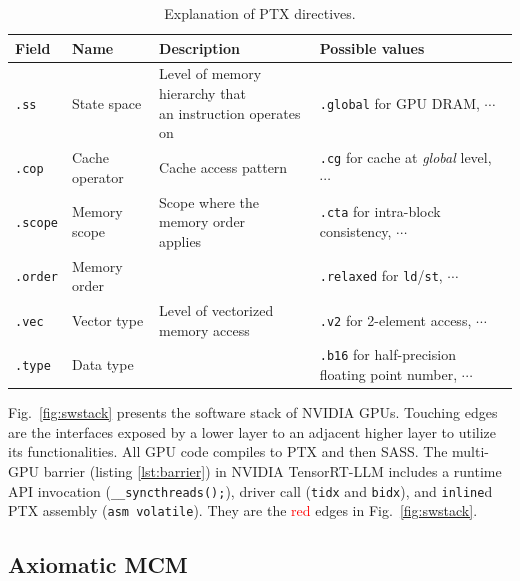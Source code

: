 \documentclass[acmsmall]{acmart}
\begin{document}
\begin{table}[H]
    \centering
    \begin{tabular}{llll}
    \toprule
    Field & Name & Description & Possible values \\
    \hline
    \verb|.ss| & State space & \makecell[l]{Level of memory hierarchy that\\an instruction operates on} & \verb|.global| for GPU DRAM, $\cdots$\\
    \verb|.cop| & Cache operator & Cache access pattern & \verb|.cg| for cache at \textit{global} level, $\cdots$\\
    \verb|.scope| & Memory scope & \makecell[l]{Scope where the memory order\\applies} & \makecell[l]{\texttt{.cta} for intra-block consistency,\\$\cdots$}\\
    \verb|.order| & Memory order & & \verb|.relaxed| for \texttt{ld}/\texttt{st}, $\cdots$\\
    \verb|.vec| & Vector type & Level of vectorized memory access & \verb|.v2| for 2-element access, $\cdots$\\
    \verb|.type| & Data type & & \makecell[l]{\texttt{.b16} for half-precision floating\\point number, $\cdots$}\\
    \bottomrule
    \end{tabular}
    \caption{Explanation of PTX directives.}
    \label{table:ptx}
\end{table}

Fig.~\ref{fig:swstack} presents the software stack of NVIDIA GPUs. Touching edges are the interfaces exposed by a lower layer to an adjacent higher layer to utilize its functionalities. All GPU code compiles to PTX and then SASS. The multi-GPU barrier (listing \ref{lst:barrier}) in NVIDIA TensorRT-LLM \cite{trt-llm} includes a runtime API invocation (\verb|__syncthreads();|), driver call (\verb|tidx| and \verb|bidx|), and \verb|inline|d PTX assembly (\verb|asm volatile|). They are the \textcolor{red}{red} edges in Fig.~\ref{fig:swstack}.

\subsection{Axiomatic MCM}
\label{sec:mcm}

\end{document}
